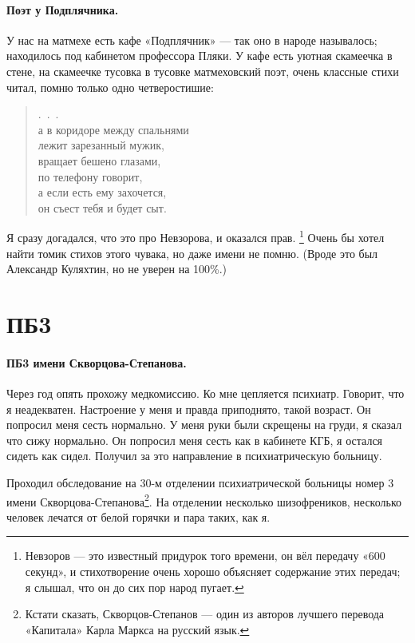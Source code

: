 \documentclass{book}
\begin{document}
\paragraph{Поэт у Подплячника.}
У нас на матмехе есть кафе «Подплячник» --- так оно в народе называлось; находилось под кабинетом профессора Пляки.
У кафе есть уютная скамеечка в стене, на скамеечке тусовка в тусовке матмеховский поэт, очень классные стихи читал, помню только одно четверостишие:
\begin{verse}
\qquad\qquad.\ .\ .
\\
а в коридоре между  спальнями
\\
\qquad лежит зарезанный мужик,
\\
вращает бешено глазами,
\\
\qquad по телефону говорит,
\\
а если есть ему захочется,
\\
\qquad он съест тебя и будет сыт.
\end{verse}
Я сразу догадался, что это про Невзорова, и оказался прав.%
\footnote{Невзоров --- это известный придурок того времени, он вёл передачу «600 секунд», и стихотворение очень хорошо объясняет содержание этих передач; я слышал, что он до сих пор народ пугает.}
Очень бы хотел найти томик стихов этого чувака, но даже имени не помню.
(Вроде это был Александр Куляхтин, но не уверен на 100\%.)

\section*{ПБ3}

\paragraph{ПБ3 имени Скворцова-Степанова.}
Через год опять прохожу медкомиссию.
Ко мне цепляется психиатр. 
Говорит, что я неадекватен.
Настроение у меня и правда приподнято, такой возраст.
Он попросил меня сесть нормально.
У меня руки были скрещены на груди,
я сказал что сижу нормально.
Он попросил меня сесть как в кабинете КГБ,
я остался сидеть как сидел.
Получил за это направление в психиатрическую больницу.

Проходил обследование на 30-м отделении психиатрической больницы номер 3 имени Скворцова-Степанова\footnote{Кстати сказать, Скворцов-Степанов --- один из авторов лучшего перевода «Капитала» Карла Маркса на русский язык.}.
На отделении несколько шизофреников, 
несколько человек лечатся от белой горячки и пара таких, как я.
\end{document}
